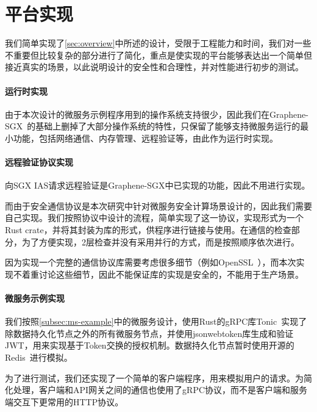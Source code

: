 \section{平台实现}\label{sec:implimentation}

我们简单实现了\cref{sec:overview}中所述的设计，受限于工程能力和时间，我们对一些不重要但比较复杂的部分进行了简化，重点是使实现的平台能够表达出一个简单但接近真实的场景，以此说明设计的安全性和合理性，并对性能进行初步的测试。

\paragraph{运行时实现}

由于本次设计的微服务示例程序用到的操作系统支持很少，因此我们在Graphene-SGX~\cite{tsai2017graphene}的基础上删掉了大部分操作系统的特性，只保留了能够支持微服务运行的最小功能，包括网络通信、内存管理、远程验证等，由此作为运行时实现。

\paragraph{远程验证协议实现}

向SGX IAS请求远程验证是Graphene-SGX中已实现的功能，因此不用进行实现。

而由于安全通信协议是本次研究中针对微服务安全计算场景设计的，因此我们需要自己实现。我们按照协议中设计的流程，简单实现了这一协议，实现形式为一个Rust crate，并将其封装为库的形式，供程序进行链接与使用。在通信的检查部分，为了方便实现，2层检查并没有采用并行的方式，而是按照顺序依次进行。

因为实现一个完整的通信协议库需要考虑很多细节（例如OpenSSL~\cite{openssl}），而本次实现不着重讨论这些细节，因此不能保证库的实现是安全的，不能用于生产场景。

\paragraph{微服务示例实现}

我们按照\cref{subsec:ms-example}中的微服务设计，使用Rust的gRPC库Tonic~\cite{tonic}实现了除数据持久化节点之外的所有微服务节点，并使用jsonwebtoken库生成和验证JWT，用来实现基于Token交换的授权机制。数据持久化节点暂时使用开源的Redis~\cite{redis}进行模拟。

为了进行测试，我们还实现了一个简单的客户端程序，用来模拟用户的请求。为简化处理，客户端和API网关之间的通信也使用了gRPC协议，而不是客户端和服务端交互下更常用的HTTP协议。
